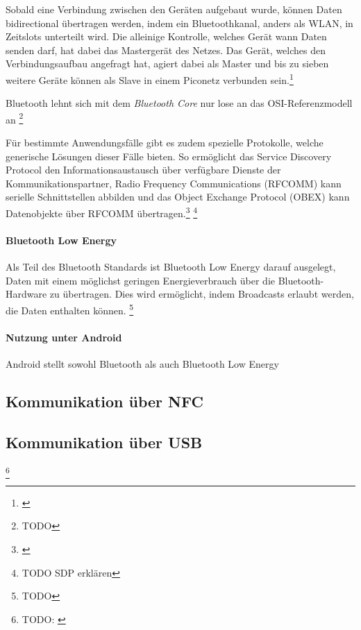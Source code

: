        Sobald eine Verbindung zwischen den Geräten aufgebaut wurde, können Daten bidirectional übertragen werden, indem ein Bluetoothkanal, anders als WLAN, in Zeitslots unterteilt wird.
        Die alleinige Kontrolle, welches Gerät wann Daten senden darf, hat dabei das Mastergerät des Netzes. Das Gerät, welches den Verbindungsaufbau angefragt hat,
        agiert dabei als Master und bis zu sieben weitere Geräte können als Slave in einem Piconetz verbunden sein.\footnote{\cite[S.379f.]{Sauter}}

        Bluetooth lehnt sich mit dem {\it Bluetooth Core} nur lose an das OSI-Referenzmodell an \footnote{TODO}

        Für bestimmte Anwendungsfälle gibt es zudem spezielle Protokolle, welche generische Lösungen dieser Fälle bieten.
        So ermöglicht das Service Discovery Protocol den Informationsaustausch über verfügbare Dienste der Kommunikationspartner,
        Radio Frequency Communications (RFCOMM) kann serielle Schnittstellen abbilden und das Object Exchange Protocol (OBEX) kann Datenobjekte über RFCOMM übertragen.\footnote{\cite[S.229]{Lueders}}
        \footnote{TODO SDP erklären}

        \paragraph{Bluetooth Low Energy}
        Als Teil des Bluetooth Standards ist Bluetooth Low Energy darauf ausgelegt, Daten mit einem möglichst geringen Energieverbrauch über die Bluetooth-Hardware zu übertragen.
        Dies wird ermöglicht, indem Broadcasts erlaubt werden, die Daten enthalten können. \footnote{TODO}

        \paragraph{Nutzung unter Android}
        Android stellt sowohl Bluetooth als auch Bluetooth Low Energy 

    \subsection{Kommunikation über NFC}

    \subsection{Kommunikation über USB}
    \footnote{TODO: \cite{AOA}}
